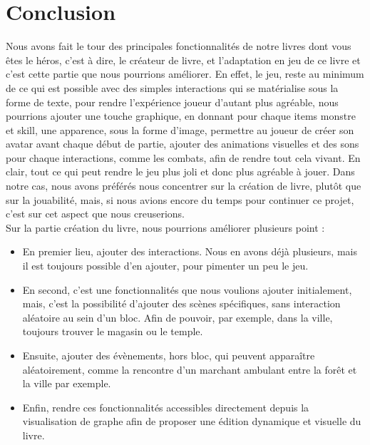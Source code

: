 \documentclass[12pt]{article}
\begin{document}
\newpage
\section{Conclusion}
Nous avons fait le tour des principales fonctionnalités de notre livres dont vous êtes le héros, c’est à dire, le créateur de livre, et l’adaptation en jeu de ce livre et c’est cette partie que nous pourrions améliorer. En effet, le jeu, reste au minimum de ce qui est possible avec des simples interactions qui se matérialise sous la forme de texte, pour rendre l’expérience joueur d’autant plus agréable, nous pourrions ajouter une touche graphique, en donnant pour chaque items monstre et skill, une apparence, sous la forme d’image, permettre au joueur de créer son avatar avant chaque début de partie, ajouter des animations visuelles et des sons pour chaque interactions, comme les combats, afin de rendre tout cela vivant. En clair, tout ce qui peut rendre le jeu plus joli et donc plus agréable à jouer. Dans notre cas, nous avons préférés nous concentrer sur la création de livre, plutôt que sur la jouabilité, mais, si nous avions encore du temps pour continuer ce projet, c’est sur cet aspect que nous creuserions.\\

Sur la partie création du livre, nous pourrions améliorer plusieurs point :

\begin{itemize}
    \item En premier lieu, ajouter des interactions. Nous en avons déjà plusieurs, mais il est toujours possible d’en ajouter, pour pimenter un peu le jeu.\\
    \item En second, c’est une fonctionnalités que nous voulions ajouter initialement, mais, c’est la possibilité d’ajouter des scènes spécifiques, sans interaction aléatoire au sein d’un bloc. Afin de pouvoir, par exemple, dans la ville, toujours trouver le magasin ou le temple.\\
    \item Ensuite, ajouter des évènements, hors bloc, qui peuvent apparaître aléatoirement, comme la rencontre d’un marchant ambulant entre la forêt et la ville par exemple.\\
    \item Enfin, rendre ces fonctionnalités accessibles directement depuis la visualisation de graphe afin de proposer une édition dynamique et visuelle du livre.
\end{itemize}
\end{document}
